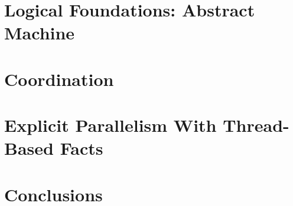 \documentclass[12pt]{cmuthesis}
\theoremstyle{indented}
\begin{document}
\chapter{Logical Foundations: Abstract Machine}



\chapter{Coordination}\label{chapter:coordination}


\chapter{Explicit Parallelism With Thread-Based Facts}


\chapter{Conclusions}


\appendix


\backmatter


\renewcommand{\bibsection}{\chapter{\bibname}}

\end{document}
